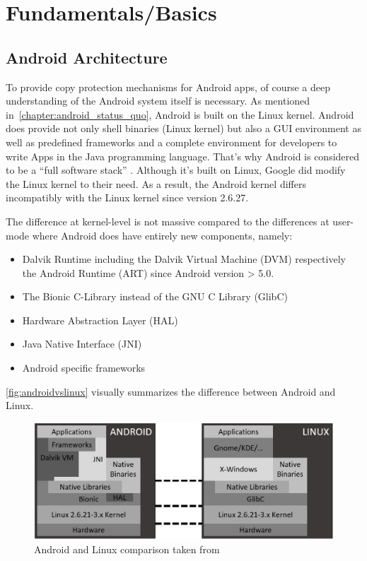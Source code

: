\chapter{Fundamentals/Basics}\label{chapter:android_basics}

\section{Android Architecture}\label{section:android_architecture}
To provide copy protection mechanisms for Android apps,
of course a deep understanding of the Android system itself
is necessary. As mentioned in~\autoref{chapter:android_status_quo},
Android is built on the Linux kernel. Android does provide not
only shell binaries (Linux kernel) but also a GUI environment
as well as predefined frameworks and a complete environment
for developers to write Apps in the Java programming language.
That's why Android is considered to be a ``full software stack''
\parencite[p.7f]{levin}. Although it's built on Linux,
Google did modify the Linux kernel to their need.
As a result, the Android kernel differs
incompatibly with the Linux kernel since version 2.6.27.

The difference at kernel-level is not massive compared to
the differences at user-mode where Android does have entirely new
components, namely:

\begin{itemize}
\item Dalvik Runtime including the Dalvik Virtual Machine (DVM)
respectively the Android Runtime (ART) since Android version > 5.0.
\item The Bionic C-Library instead of the GNU C Library (GlibC)
\item Hardware Abstraction Layer (HAL)
\item Java Native Interface (JNI)
\item Android specific frameworks
\end{itemize}

\autoref{fig:androidvslinux} visually summarizes the difference
between Android and Linux.

\begin{figure}[htb]
  \includegraphics[width=\textwidth]{figures/androidvslinux}
  \caption[Android vs Linux]{Android and Linux comparison taken from
  ~\parencite[p.9]{levin}}
  \label{fig:androidvslinux}
\end{figure}

